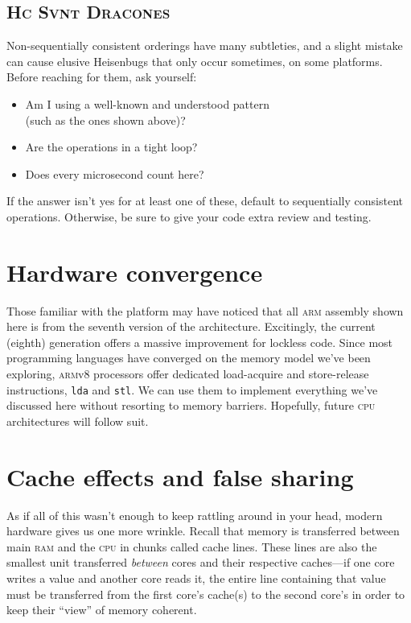 \documentclass[fontsize=\bodyfontsize, numbers=endperiod]{scrartcl}
\newcommand{\monobox}[1]{\mbox{\texttt{#1}}}
\newcommand{\keyword}[1]{\monobox{\color{darkGreen}#1}}
\begin{document}
\begin{multicols}{2}
\subsection{\textsc{Hc Svnt Dracones}}

Non-sequentially consistent orderings have many subtleties,
and a slight mistake can cause elusive Heisenbugs that only occur sometimes,
on some platforms.
Before reaching for them, ask yourself:
\begin{itemize}[label={}, before=\itshape]
\item Am I using a well-known and understood pattern \\
      (such as the ones shown above)?
\item Are the operations in a tight loop?
\item Does every microsecond count here?
\end{itemize}
If the answer isn't yes for at least one of these,
default to sequentially consistent operations.
Otherwise, be sure to give your code extra review and testing.

\section{Hardware convergence}

Those familiar with the platform may have noticed that all \textsc{arm} assembly
shown here is from the seventh version of the architecture.
Excitingly, the current (eighth) generation offers a massive
improvement for lockless code.
Since most programming languages have converged on the memory model we've been
exploring, \textsc{arm}v8 processors offer dedicated load-acquire
and store-release instructions, \keyword{lda} and \keyword{stl}.
We can use them to implement everything we've discussed here without
resorting to memory barriers.
Hopefully, future \textsc{cpu} architectures will follow suit.

\section{Cache effects and false sharing}
\label{false-sharing}

As if all of this wasn't enough to keep rattling around in your head,
modern hardware gives us one more wrinkle.
Recall that memory is transferred between main \textsc{ram} and the \textsc{cpu}
in chunks called cache lines.
These lines are also the smallest unit transferred
\emph{between} cores and their respective caches---if one core writes a value
and another core reads it, the entire line containing that value must be
transferred from the first core's cache(s) to the second core's in order to
keep their ``view'' of memory coherent.


\end{multicols}
\end{document}
